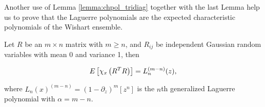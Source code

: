     Another use of Lemma \ref{lemma:chpol_tridiag} together with the last Lemma help us to prove that the Laguerre polynomials are the expected characteristic polynomials of the Wishart ensemble.


\begin{theorem}
    Let $R$ be an $m\times n$ matrix with $m\ge n$, and $R_{ij}$ be independent Gaussian random variables with mean 0 and variance 1, then

    \begin{equation*}
        E\left[ \chi_x\left(R^TR\right) \right] = L_n^{(m-n)}(z),
    \end{equation*}

    \noindent where $L_n(x)^{(m-n)} = \left( 1 - \partial_z \right)^{m} [z^n]$ is the $n$th generalized Laguerre polynomial with $\alpha = m-n$.
\end{theorem}

